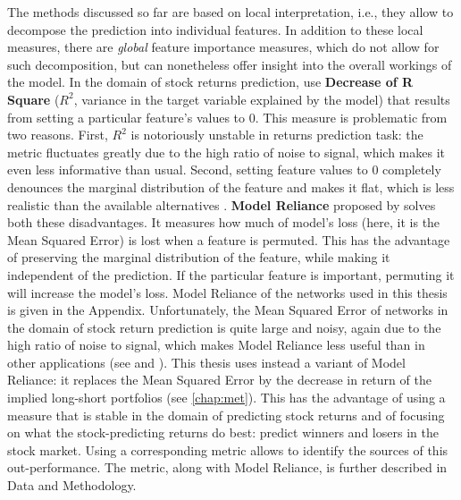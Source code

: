 			The methods discussed so far are based on local interpretation, i.e., they allow to decompose the prediction into individual features. In addition to these local measures, there are \textit{global} feature importance measures, which do not allow for such decomposition, but can nonetheless offer insight into the overall workings of the model. In the domain of stock returns prediction, \cite{gu2020empirical} use \textbf{Decrease of R Square} ($R^2$, variance in the target variable explained by the model) that results from setting a particular feature's values to 0. This measure is problematic from two reasons. First, $R^2$ is notoriously unstable in returns prediction task: the metric fluctuates greatly due to the high ratio of noise to signal, which makes it even less informative than usual. Second, setting feature values to 0 completely denounces the marginal distribution of the feature and makes it flat, which is less realistic than the available alternatives \citep{fisher2019all}. \textbf{Model Reliance} proposed by \citep{fisher2019all} solves both these disadvantages. It measures how much of model's loss (here, it is the Mean Squared Error) is lost when a feature is permuted. This has the advantage of preserving the marginal distribution of the feature, while making it independent of the prediction. If the particular feature is important, permuting it will increase the model's loss. Model Reliance of the networks used in this thesis is given in the Appendix. Unfortunately, the Mean Squared Error of networks in the domain of stock return prediction is quite large and noisy, again due to the high ratio of noise to signal, which makes Model Reliance less useful than in other applications (see \cite{fisher2019all} and \cite{molnar2020interpretable}). This thesis uses instead a variant of Model Reliance: it replaces the Mean Squared Error by the decrease in return of the implied long-short portfolios (see \ref{chap:met}). This has the advantage of using a measure that is stable in the domain of predicting stock returns and of 		focusing on what the stock-predicting returns do best: predict winners and losers in the stock market. Using a corresponding metric allows to identify the sources of this out-performance. The metric, along with Model Reliance, is further described in Data and Methodology. 		

			
			
		
		 

	

